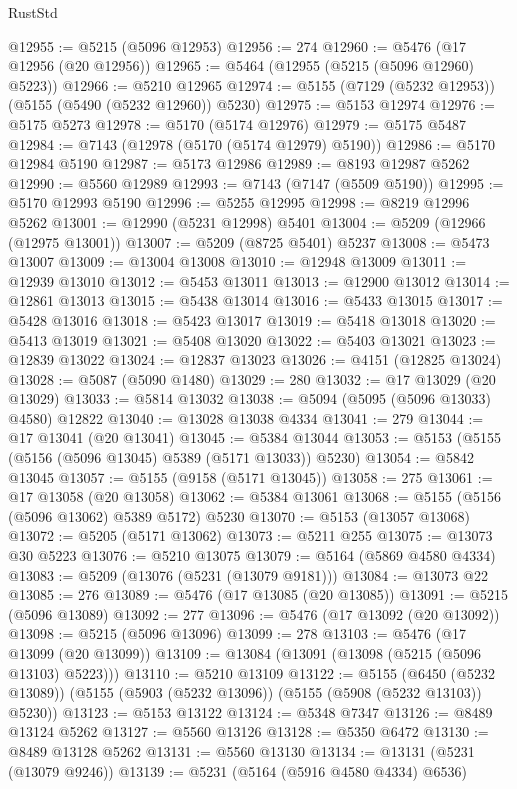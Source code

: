 \begin{lexlean}{RustStd}
\begin{coremodule}
@12955 := @5215 (@5096 @12953)
@12956 := 274
@12960 := @5476 (@17 @12956 (@20 @12956))
@12965 := @5464 (@12955 (@5215 (@5096 @12960) @5223))
@12966 := @5210 @12965
@12974 := @5155 (@7129 (@5232 @12953)) (@5155 (@5490 (@5232 @12960)) @5230)
@12975 := @5153 @12974
@12976 := @5175 @5273
@12978 := @5170 (@5174 @12976)
@12979 := @5175 @5487
@12984 := @7143 (@12978 (@5170 (@5174 @12979) @5190))
@12986 := @5170 @12984 @5190
@12987 := @5173 @12986
@12989 := @8193 @12987 @5262
@12990 := @5560 @12989
@12993 := @7143 (@7147 (@5509 @5190))
@12995 := @5170 @12993 @5190
@12996 := @5255 @12995
@12998 := @8219 @12996 @5262
@13001 := @12990 (@5231 @12998) @5401
@13004 := @5209 (@12966 (@12975 @13001))
@13007 := @5209 (@8725 @5401) @5237
@13008 := @5473 @13007
@13009 := @13004 @13008
@13010 := @12948 @13009
@13011 := @12939 @13010
@13012 := @5453 @13011
@13013 := @12900 @13012
@13014 := @12861 @13013
@13015 := @5438 @13014
@13016 := @5433 @13015
@13017 := @5428 @13016
@13018 := @5423 @13017
@13019 := @5418 @13018
@13020 := @5413 @13019
@13021 := @5408 @13020
@13022 := @5403 @13021
@13023 := @12839 @13022
@13024 := @12837 @13023
@13026 := @4151 (@12825 @13024)
@13028 := @5087 (@5090 @1480)
@13029 := 280
@13032 := @17 @13029 (@20 @13029)
@13033 := @5814 @13032
@13038 := @5094 (@5095 (@5096 @13033) @4580) @12822
@13040 := @13028 @13038 @4334
@13041 := 279
@13044 := @17 @13041 (@20 @13041)
@13045 := @5384 @13044
@13053 := @5153 (@5155 (@5156 (@5096 @13045) @5389 (@5171 @13033)) @5230)
@13054 := @5842 @13045
@13057 := @5155 (@9158 (@5171 @13045))
@13058 := 275
@13061 := @17 @13058 (@20 @13058)
@13062 := @5384 @13061
@13068 := @5155 (@5156 (@5096 @13062) @5389 @5172) @5230
@13070 := @5153 (@13057 @13068)
@13072 := @5205 (@5171 @13062)
@13073 := @5211 @255
@13075 := @13073 @30 @5223
@13076 := @5210 @13075
@13079 := @5164 (@5869 @4580 @4334)
@13083 := @5209 (@13076 (@5231 (@13079 @9181)))
@13084 := @13073 @22
@13085 := 276
@13089 := @5476 (@17 @13085 (@20 @13085))
@13091 := @5215 (@5096 @13089)
@13092 := 277
@13096 := @5476 (@17 @13092 (@20 @13092))
@13098 := @5215 (@5096 @13096)
@13099 := 278
@13103 := @5476 (@17 @13099 (@20 @13099))
@13109 := @13084 (@13091 (@13098 (@5215 (@5096 @13103) @5223)))
@13110 := @5210 @13109
@13122 := @5155
    (@6450 (@5232 @13089))
    (@5155 (@5903 (@5232 @13096)) (@5155 (@5908 (@5232 @13103)) @5230))
@13123 := @5153 @13122
@13124 := @5348 @7347
@13126 := @8489 @13124 @5262
@13127 := @5560 @13126
@13128 := @5350 @6472
@13130 := @8489 @13128 @5262
@13131 := @5560 @13130
@13134 := @13131 (@5231 (@13079 @9246))
@13139 := @5231 (@5164 (@5916 @4580 @4334) @6536)

\end{coremodule}
\end{lexlean}
